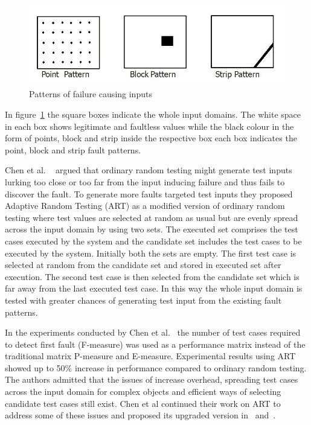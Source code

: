 {\begin{figure}[h]
	\centering
	\includegraphics[scale=0.5]{Literature/pointblockstrip.jpg}
	\caption{Patterns of failure causing inputs}
	\label{fig:patterns2}
\end{figure}

In figure~\ref{fig:patterns2} the square boxes indicate the whole input domains. The white space in each box shows legitimate and faultless values while the black colour in the form of points, block and strip inside the respective box each box indicates the point, block and strip fault patterns.

Chen et al. ~\cite{Chen2008} argued that ordinary random testing might generate test inputs lurking too close or too far from the input inducing failure and thus fails to discover the fault. To generate more faults targeted test inputs they proposed Adaptive Random Testing (ART) as a modified version of ordinary random testing where test values are selected at random as usual but are evenly spread across the input domain by using two sets. The executed set comprises the test cases executed by the system and the candidate set includes the test cases to be executed by the system. Initially both the sets are empty. The first test case is selected at random from the candidate set and stored in executed set after execution. The second test case is then selected from the candidate set which is far away from the last executed test case. In this way the whole input domain is tested with greater chances of generating test input from the existing fault patterns.

In the experiments conducted by Chen et al.~\cite{Chen2008} the number of test cases required to detect first fault (F-measure) was used as a performance matrix instead of the traditional matrix P-measure and E-measure. Experimental results using ART showed up to 50\% increase in performance compared to ordinary random testing. The authors admitted that the issues of increase overhead, spreading test cases across the input domain for complex objects and efficient ways of selecting candidate test cases still exist. Chen et al continued their work on ART to address some of these issues and proposed its upgraded version in~\cite{chen2009enhanced} and~\cite{Chen2005}. 

}
